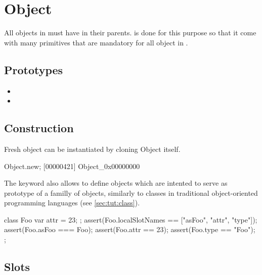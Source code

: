 \section{Object}

All objects in \us must have  in their
parents.  is done for this purpose so that it come
with many primitives that are mandatory for all object in \us.

\subsection{Prototypes}

\begin{itemize}
\item {}
\item {}
\end{itemize}

\subsection{Construction}

Fresh object can be instantiated by cloning Object itself.

\begin{urbiscript}
Object.new;
[00000421] Object_0x00000000
\end{urbiscript}

The keyword  also allows to define objects which are
intented to serve as prototype of a familly of objects, similarly to
classes in traditional object-oriented programming languages (see
\autoref{sec:tut:class}).

\begin{urbiscript}[firstnumber=last]
{
  class Foo
  {
    var attr = 23;
  };
  assert(Foo.localSlotNames == ["asFoo", "attr", "type"]);
  assert(Foo.asFoo === Foo);
  assert(Foo.attr == 23);
  assert(Foo.type == "Foo");
};
\end{urbiscript}


\subsection{Slots}

